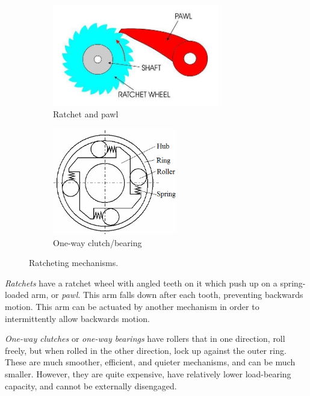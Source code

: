 \documentclass[10pt,letterpaper]{book}
\begin{document}
\begin{figure}[H]
	\begin{subfigure}[b]{.4\linewidth}
		\includegraphics[width=0.8\textwidth]{imgs/ratchet.jpeg}
		\caption{Ratchet and pawl}
	\end{subfigure}\begin{subfigure}[b]{.4\linewidth}
		\includegraphics[width=0.6\textwidth]{imgs/oneway_clutch.png}
		\caption{One-way clutch/bearing}
	\end{subfigure}
	\caption{Ratcheting mechanisms.}
\end{figure}

\begin{asparaenum}[a)]
	\item \textit{Ratchets} have a ratchet wheel with angled teeth on it which push up on a spring-loaded arm, or \textit{pawl}. This arm falls down after each tooth, preventing backwards motion. This arm can be actuated by another mechanism in order to intermittently allow backwards motion.
	\item \textit{One-way clutches} or \textit{one-way bearings} have rollers that in one direction, roll freely, but when rolled in the other direction, lock up against the outer ring. These are much smoother, efficient, and quieter mechanisms, and can be much smaller. However, they are quite expensive, have relatively lower load-bearing capacity, and cannot be externally disengaged.
\end{asparaenum}
\end{document}
